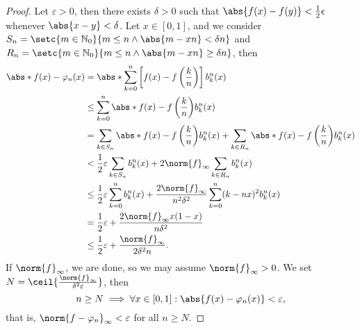 \begin{proof}
     Let \(\varepsilon > 0\), then there exists \(\delta > 0\) such that \(\abs{f(x) - f(y)} < \frac12\epsilon\) whenever \(\abs{x - y} < \delta\). Let \(x \in [0,1]\), and we consider \(S_n = \setc{m \in \mathbb{N}_0}{m \leq n \land \abs{m - xn} < \delta n}\) and \(R_n = \setc{m \in \mathbb{N}_0}{m \leq n \land \abs{m - xn} \geq \delta n}\), then
    \begin{align*}
        \abs*{f(x) - \varphi_n(x)} &= \abs*{\sum_{k = 0}^n \left[f(x) - f\left(\frac{k}{n}\right)\right]b^n_k(x)}\\
                                  &\leq \sum_{k = 0}^n \abs*{f(x) - f\left(\frac{k}{n}\right)}b^n_k(x)\\
                                  &= \sum_{k \in S_n} \abs*{f(x) - f\left(\frac{k}{n}\right)}b^n_k(x) + \sum_{k \in R_n} \abs*{f(x) - f\left(\frac{k}{n}\right)}b^n_k(x)\\
                                  &< \frac12\varepsilon \sum_{k \in S_n} b^n_k(x) + 2 \norm{f}_\infty \sum_{k \in R_n} b^n_k(x)\\
                                  &\leq \frac12 \varepsilon \sum_{k = 0}^n b^n_k(x) + \frac{2\norm{f}_\infty}{n^2 \delta^2}\sum_{k=0}^n (k - nx)^2 b^n_k(x)\\
                                  &= \frac12 \varepsilon + \frac{2 \norm{f}_{\infty}x(1 - x)}{n \delta^2}\\
                                  &\leq \frac12 \varepsilon + \frac{\norm{f}_\infty}{2 \delta^2 n}.
    \end{align*}
    If \(\norm{f}_\infty\), we are done, so we may assume \(\norm{f}_\infty > 0\). We set \(N = \ceil{\frac{\norm{f}_\infty}{\delta^2 \varepsilon}}\), then
    \begin{equation*}
        n \geq N \implies \forall x \in [0,1]: \abs{f(x) - \varphi_n(x)} < \varepsilon,
    \end{equation*}
    that is, \(\norm{f - \varphi_n}_\infty < \varepsilon\) for all \(n \geq N\).
\end{proof}
